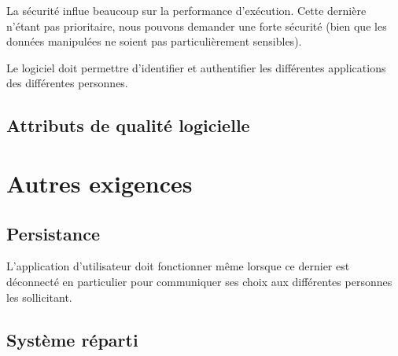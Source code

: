 La sécurité influe beaucoup sur la performance d'exécution. Cette dernière n'étant pas prioritaire, nous pouvons demander une forte sécurité (bien que les données manipulées ne soient pas particulièrement sensibles).

\begin{requirement}[Identification]
	Le logiciel doit permettre d'identifier et authentifier les différentes applications des différentes personnes.
\end{requirement}

\subsection{Attributs de qualité logicielle}
	

\section{Autres exigences}

\subsection{Persistance}

\begin{requirement}[Persistance]
	L’application d’utilisateur doit fonctionner même lorsque ce dernier est déconnecté en particulier pour communiquer ses choix aux différentes personnes les sollicitant.
\end{requirement}

\subsection{Système réparti}

